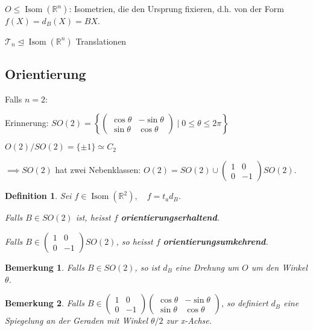 \documentclass{article}
\theoremstyle{plain}
\newtheorem{definition}{Definition}
\newtheorem{bemerkung}{Bemerkung}
\newcommand{\defn}[1]{\textbf{#1}}
\newcommand{\R}{\mathbb{R}}
\newcommand{\normal}{\trianglelefteq}
\newcommand{\iso}{\simeq}
\newcommand{\isom}{\mathop\text{Isom}}
\newcommand{\trans}{\mathcal{T}}
\begin{document}
$O\leq \isom(\R^n)$: Isometrien, die den Ursprung fixieren, d.h. von der Form $f(X)=d_B(X)=BX$.

$\trans_n\normal \isom(\R^n)$ Translationen


\subsection*{Orientierung}

Falls $n=2:$

Erinnerung:
$SO(2)=\left\{
    \begin{pmatrix}
        \cos\theta&-\sin\theta\\ \sin\theta&\cos\theta
    \end{pmatrix}\mid 0\leq\theta\leq2\pi\right\}
$

$O(2)/SO(2)=\{\pm 1\}\iso C_2$

$\implies SO(2)$ hat zwei Nebenklassen:
$O(2)=SO(2)\cup\begin{pmatrix}
    1&0\\0&-1
\end{pmatrix} SO(2)$.

\begin{definition}
Sei $f\in \isom(\R^2), \quad f=t_ad_B$.

Falls $B\in SO(2)$ ist, heisst $f$ \defn{orientierungserhaltend}.

Falls $B\in \begin{pmatrix}1&0\\0&-1\end{pmatrix} SO(2)$, so heisst $f$ \defn{orientierungsumkehrend}.
\end{definition}

\begin{bemerkung}
    Falls $B\in SO(2)$, so ist $d_B$ eine Drehung um $O$ um den Winkel $\theta$.
\end{bemerkung}

\begin{bemerkung}
Falls $B\in  \begin{pmatrix}1&0\\0&-1\end{pmatrix} \begin{pmatrix}
        \cos\theta&-\sin\theta\\ \sin\theta&\cos\theta
    \end{pmatrix}$, so definiert $d_B$ eine Spiegelung an der Geraden mit Winkel $\theta/2$ zur x-Achse.
\end{bemerkung}
\end{document}
